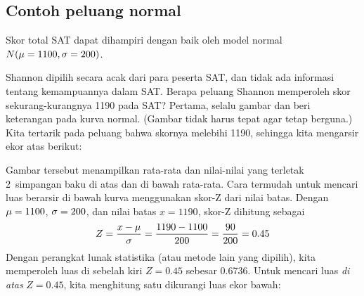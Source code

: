 
\subsection{Contoh peluang normal}
\label{normal_probability_examples}

\noindent%
Skor total SAT dapat dihampiri dengan baik oleh model normal
$N(\mu = 1100{}, \sigma = 200{})$.

\newcommand{\shannonsat}{1190}
\newcommand{\shannonsatz}{0.45}
\begin{examplewrap}
\begin{nexample}{Shannon dipilih secara acak dari para peserta SAT,
    dan tidak ada informasi tentang kemampuannya dalam SAT.
    Berapa peluang Shannon memperoleh skor sekurang-kurangnya
    \shannonsat{} pada SAT?}
  \label{satAbove1190Exam}%
  Pertama, selalu gambar dan beri keterangan pada kurva normal.
  (Gambar tidak harus tepat agar tetap berguna.)
  Kita tertarik pada peluang bahwa skornya melebihi \shannonsat{},
  sehingga kita mengarsir ekor atas berikut:
  \begin{center}
  \end{center}
  Gambar tersebut menampilkan rata-rata dan nilai-nilai yang terletak
  2~simpangan baku di atas dan di bawah rata-rata.
  Cara termudah untuk mencari luas berarsir di bawah kurva menggunakan
  skor-Z dari nilai batas.
  Dengan $\mu = 1100{}$, $\sigma = 200{}$,
  dan nilai batas $x = \shannonsat{}$, skor-Z dihitung sebagai
  \begin{align*}
  Z = \frac{x - \mu}{\sigma}
    = \frac{\shannonsat{} - \satmean{}}{\satsd{}}
    = \frac{90}{\satsd{}}
    = \shannonsatz{}
  \end{align*}
  Dengan perangkat lunak statistika (atau metode lain yang dipilih),
  kita memperoleh luas di sebelah kiri $Z = \shannonsatz{}$ sebesar 0.6736.
  Untuk mencari luas \emph{di atas} $Z = \shannonsatz{}$,
  kita menghitung satu dikurangi luas ekor bawah:
  \begin{center}

\end{center}
\end{nexample}
\end{examplewrap}
